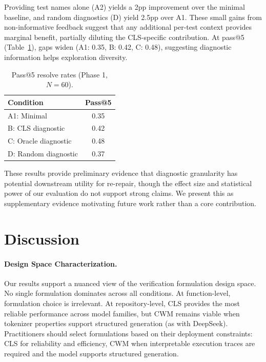 \documentclass[11pt]{article}
\begin{document}
Providing test names alone (A2) yields a 2pp improvement over the minimal baseline, and random diagnostics (D) yield 2.5pp over A1. These small gains from non-informative feedback suggest that any additional per-test context provides marginal benefit, partially diluting the CLS-specific contribution. At pass@5 (Table~\ref{tab:rerepair-passat5}), gaps widen (A1: 0.35, B: 0.42, C: 0.48), suggesting diagnostic information helps exploration diversity.

\begin{table}[t]
\centering
\caption{Pass@5 resolve rates (Phase 1, $N=60$).}
\label{tab:rerepair-passat5}
\begin{tabular}{lc}
\toprule
Condition & Pass@5 \\
\midrule
A1: Minimal & 0.35 \\
B: CLS diagnostic & 0.42 \\
C: Oracle diagnostic & 0.48 \\
D: Random diagnostic & 0.37 \\
\bottomrule
\end{tabular}
\end{table}

These results provide preliminary evidence that diagnostic granularity has potential downstream utility for re-repair, though the effect size and statistical power of our evaluation do not support strong claims. We present this as supplementary evidence motivating future work rather than a core contribution.

\section{Discussion}
\label{sec:discussion}

\paragraph{Design Space Characterization.}
Our results support a nuanced view of the verification formulation design space. No single formulation dominates across all conditions. At function-level, formulation choice is irrelevant. At repository-level, CLS provides the most reliable performance across model families, but CWM remains viable when tokenizer properties support structured generation (as with DeepSeek). Practitioners should select formulations based on their deployment constraints: CLS for reliability and efficiency, CWM when interpretable execution traces are required and the model supports structured generation.
\end{document}

